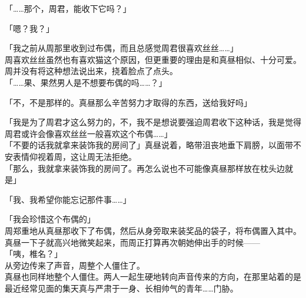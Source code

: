 「……那个，周君，能收下它吗？」

「嗯？我？」

「我之前从周那里收到过布偶，而且总感觉周君很喜欢丝丝……」\\

周喜欢丝丝虽然也有喜欢猫这个原因，但更重要的理由是和真昼相似、十分可爱。周并没有将这种想法说出来，挠着脸点了点头。\\

「……果、果然男人是不想要布偶的吗……？」

「不，不是那样的。真昼那么辛苦努力才取得的东西，送给我好吗」

「我是为了周君才这么努力的，不，我不是想说要强迫周君收下这种话，我是觉得周君或许会像喜欢丝丝一般喜欢这个布偶……」\\

「不要的话我就拿来装饰我的房间了」真昼说着，略带沮丧地垂下肩膀，以面带不安表情仰视着周，这让周无法拒绝。\\

「那么，我就拿来装饰我的房间了。再怎么说也不可能像真昼那样放在枕头边就是」

「我、我希望你能忘记那件事……」

「我会珍惜这个布偶的」\\

周郑重地从真昼那收下了布偶，然后从身旁取来装奖品的袋子，将布偶置入其中。\\

真昼一下子就高兴地微笑起来，而周正打算再次朝她伸出手的时候——\\

「咦，椎名？」\\

从旁边传来了声音，周整个人僵住了。\\

真昼也同样地整个人僵住。两人一起生硬地转向声音传来的方向，在那里站着的是最近经常见面的集天真与严肃于一身、长相帅气的青年……门胁。
